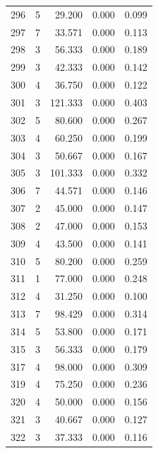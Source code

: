 \begin{table}
\begin{tabular}{rrrrr}
 296 &      5 &         29.200 &        0.000 &           0.099 \\
 297 &      7 &         33.571 &        0.000 &           0.113 \\
 298 &      3 &         56.333 &        0.000 &           0.189 \\
 299 &      3 &         42.333 &        0.000 &           0.142 \\
 300 &      4 &         36.750 &        0.000 &           0.122 \\
 301 &      3 &        121.333 &        0.000 &           0.403 \\
 302 &      5 &         80.600 &        0.000 &           0.267 \\
 303 &      4 &         60.250 &        0.000 &           0.199 \\
 304 &      3 &         50.667 &        0.000 &           0.167 \\
 305 &      3 &        101.333 &        0.000 &           0.332 \\
 306 &      7 &         44.571 &        0.000 &           0.146 \\
 307 &      2 &         45.000 &        0.000 &           0.147 \\
 308 &      2 &         47.000 &        0.000 &           0.153 \\
 309 &      4 &         43.500 &        0.000 &           0.141 \\
 310 &      5 &         80.200 &        0.000 &           0.259 \\
 311 &      1 &         77.000 &        0.000 &           0.248 \\
 312 &      4 &         31.250 &        0.000 &           0.100 \\
 313 &      7 &         98.429 &        0.000 &           0.314 \\
 314 &      5 &         53.800 &        0.000 &           0.171 \\
 315 &      3 &         56.333 &        0.000 &           0.179 \\
 317 &      4 &         98.000 &        0.000 &           0.309 \\
 319 &      4 &         75.250 &        0.000 &           0.236 \\
 320 &      4 &         50.000 &        0.000 &           0.156 \\
 321 &      3 &         40.667 &        0.000 &           0.127 \\
 322 &      3 &         37.333 &        0.000 &           0.116 \\

\end{tabular}
\end{table}
